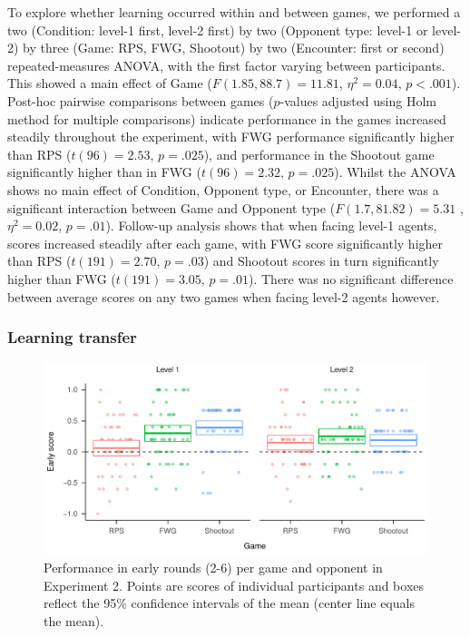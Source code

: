 \documentclass[man,floatsintext]{apa6}
\begin{document}
To explore whether learning occurred within and between games, we performed a two (Condition: level-1 first, level-2 first) by two (Opponent type: level-1 or level-2) by three (Game: RPS, FWG, Shootout) by two (Encounter: first or second) repeated-measures ANOVA, with the first factor varying between participants. This showed a main effect of Game (\(F(1.85,88.7) = 11.81\), \(\eta^{2} = 0.04\), \(p < .001\)). Post-hoc pairwise comparisons between games (\(p\)-values adjusted using Holm method for multiple comparisons) indicate performance in the games increased steadily throughout the experiment, with FWG performance significantly higher than RPS (\(t(96) =2.53\), \(p = .025\)), and performance in the Shootout game significantly higher than in FWG (\(t(96) = 2.32\), \(p = .025\)). Whilst the ANOVA shows no main effect of Condition, Opponent type, or Encounter, there was a significant interaction between Game and Opponent type (\(F(1.7, 81.82) = 5.31\) ,\(\eta^{2} = 0.02\), \(p = .01\)). Follow-up analysis shows that when facing level-1 agents, scores increased steadily after each game, with FWG score significantly higher than RPS (\(t(191) = 2.70\), \(p = .03\)) and Shootout scores in turn significantly higher than FWG (\(t(191) = 3.05\), \(p = .01\)). There was no significant difference between average scores on any two games when facing level-2 agents however.

\hypertarget{learning-transfer-1}{%
\subsubsection{Learning transfer}\label{learning-transfer-1}}

\begin{figure}

{\centering \includegraphics{paper_draft_2021_files/figure-latex/exp2-early-score-by-opp-1} 

}

\caption{\label{ref:figure4-caption}Performance in early rounds (2-6) per game and opponent in Experiment 2. Points are scores of individual participants and boxes reflect the 95\% confidence intervals of the mean (center line equals the mean).}\label{fig:exp2-early-score-by-opp}
\end{figure}
\end{document}
